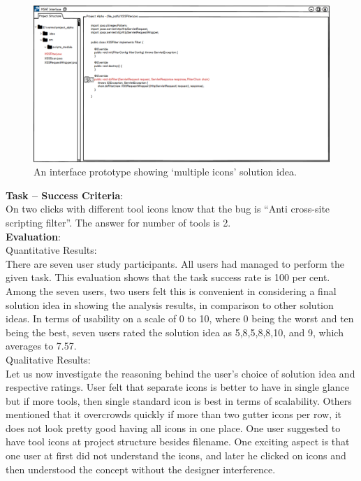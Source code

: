 \begin{figure}[hbt!]
	\centering
	\includegraphics[width=\linewidth]{figures/solution_ideas_snaps/S21_multiple_icons}
	\caption{An interface prototype showing ‘multiple icons’ solution idea.}
	\label{fig:S21_multiple_icons}
\end{figure}

\textbf{Task – Success Criteria}: \\

On two clicks with different tool icons know that the bug is “Anti cross-site scripting filter”. The answer for number of tools is 2. \\

\textbf{Evaluation}: \\

Quantitative Results: \\

There are seven user study participants. All users had managed to perform the given task. This evaluation shows that the task success rate is 100 per cent. \\

Among the seven users, two users felt this is convenient in considering a final solution idea in showing the analysis results, in comparison to other solution ideas. In terms of usability on a scale of 0 to 10, where 0 being the worst and ten being the best, seven users rated the solution idea as 5,8,5,8,8,10, and 9, which averages to 7.57. \\

Qualitative Results: \\

Let us now investigate the reasoning behind the user’s choice of solution idea and respective ratings. User felt that separate icons is better to have in single glance but if more tools, then single standard icon is best in terms of scalability. Others mentioned that it overcrowds quickly if more than two gutter icons per row, it does not look pretty good having all icons in one place. One user suggested to have tool icons at project structure besides filename. One exciting aspect is that one user at first did not understand the icons, and later he clicked on icons and then understood the concept without the designer interference. \\


